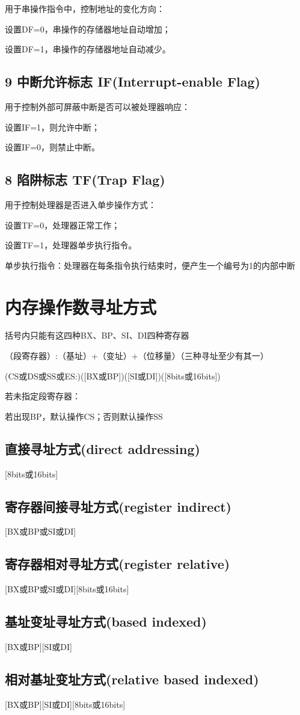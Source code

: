 \documentclass{article}
\begin{document}
用于串操作指令中，控制地址的变化方向：

设置DF=0，串操作的存储器地址自动增加；

设置DF=1，串操作的存储器地址自动减少。

\subsection{9 中断允许标志 IF(Interrupt-enable Flag)}

用于控制外部可屏蔽中断是否可以被处理器响应：

设置IF=1，则允许中断；

设置IF=0，则禁止中断。

\subsection{8 陷阱标志 TF(Trap Flag)}

用于控制处理器是否进入单步操作方式：

设置TF=0，处理器正常工作；

设置TF=1，处理器单步执行指令。

单步执行指令：处理器在每条指令执行结束时，便产生一个编号为1的内部中断

\section{内存操作数寻址方式}

括号内只能有这四种BX、BP、SI、DI四种寄存器

（段寄存器）:（基址）+（变址）+（位移量）（三种寻址至少有其一）

(CS或DS或SS或ES:)([BX或BP])([SI或DI])([8bits或16bits])

若未指定段寄存器：

若出现BP，默认操作CS；否则默认操作SS

\subsection{直接寻址方式(direct addressing)}

[8bits或16bits]

\subsection{寄存器间接寻址方式(register indirect)}

[BX或BP或SI或DI]

\subsection{寄存器相对寻址方式(register relative)}

[BX或BP或SI或DI][8bits或16bits]

\subsection{基址变址寻址方式(based indexed)}

[BX或BP][SI或DI]

\subsection{相对基址变址方式(relative based indexed)}

[BX或BP][SI或DI][8bits或16bits]
\end{document}
